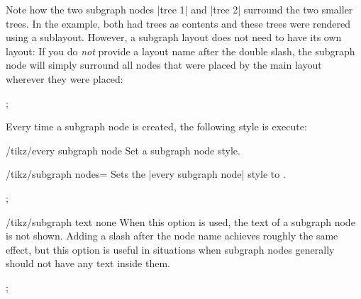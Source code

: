 Note how the two subgraph nodes |tree 1| and |tree 2| surround the two smaller
trees. In the example, both had trees as contents and these trees were rendered
using a sublayout. However, a subgraph layout does not need to have its own
layout: If you do \emph{not} provide a layout name after the double slash, the
subgraph node will simply surround all nodes that were placed by the main
layout wherever they were placed:
%
\begin{codeexample}[preamble={\usetikzlibrary{graphs,graphdrawing}
\usegdlibrary{trees}}]
\tikz [subgraph text bottom=text centered,
       subgraph nodes={font=\itshape}]
  ;
\end{codeexample}

Every time a subgraph node is created, the following style is execute:

\begin{key}{/tikz/every subgraph node}
    Set a subgraph node style.
\end{key}

\begin{key}{/tikz/subgraph nodes=}
    Sets the |every subgraph node| style to .
\begin{codeexample}[preamble={\usetikzlibrary{graphs,graphdrawing}
\usegdlibrary{trees}}]
\tikz [subgraph text bottom=text centered,
       subgraph nodes=red]
  ;
\end{codeexample}
\end{key}

\begin{key}{/tikz/subgraph text none}
    When this option is used, the text of a subgraph node is not shown. Adding
    a slash after the node name achieves roughly the same effect, but this
    option is useful in situations when subgraph nodes generally should not
    have any text inside them.
\begin{codeexample}[preamble={\usetikzlibrary{graphs,graphdrawing}
\usegdlibrary{trees}}]
  ;
\end{codeexample}
\end{key}

